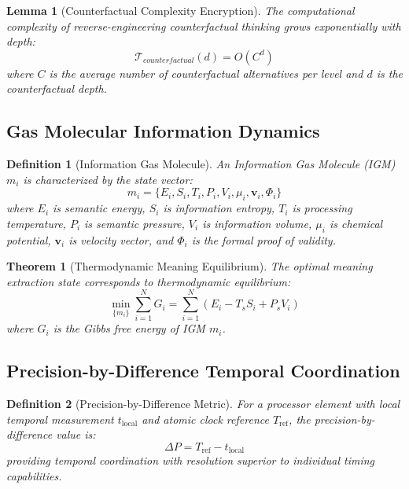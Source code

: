 \documentclass[12pt,a4paper]{article}
\newtheorem{theorem}{Theorem}
\newtheorem{lemma}{Lemma}
\newtheorem{definition}{Definition}
\begin{document}
\begin{lemma}[Counterfactual Complexity Encryption]
The computational complexity of reverse-engineering counterfactual thinking grows exponentially with depth:
\begin{equation}
\mathcal{T}_{counterfactual}(d) = O(C^d)
\end{equation}
where $C$ is the average number of counterfactual alternatives per level and $d$ is the counterfactual depth.
\end{lemma}

\subsection{Gas Molecular Information Dynamics}

\begin{definition}[Information Gas Molecule]
An Information Gas Molecule (IGM) $m_i$ is characterized by the state vector:
\begin{equation}
m_i = \{E_i, S_i, T_i, P_i, V_i, \mu_i, \mathbf{v}_i, \Phi_i\}
\end{equation}
where $E_i$ is semantic energy, $S_i$ is information entropy, $T_i$ is processing temperature, $P_i$ is semantic pressure, $V_i$ is information volume, $\mu_i$ is chemical potential, $\mathbf{v}_i$ is velocity vector, and $\Phi_i$ is the formal proof of validity.
\end{definition}

\begin{theorem}[Thermodynamic Meaning Equilibrium]
The optimal meaning extraction state corresponds to thermodynamic equilibrium:
\begin{equation}
\min_{\{m_i\}} \sum_{i=1}^{N} G_i = \sum_{i=1}^{N} (E_i - T_s S_i + P_s V_i)
\end{equation}
where $G_i$ is the Gibbs free energy of IGM $m_i$.
\end{theorem}

\subsection{Precision-by-Difference Temporal Coordination}

\begin{definition}[Precision-by-Difference Metric]
For a processor element with local temporal measurement $t_{\text{local}}$ and atomic clock reference $T_{\text{ref}}$, the precision-by-difference value is:
\begin{equation}
\Delta P = T_{\text{ref}} - t_{\text{local}}
\end{equation}
providing temporal coordination with resolution superior to individual timing capabilities.
\end{definition}
\end{document}
